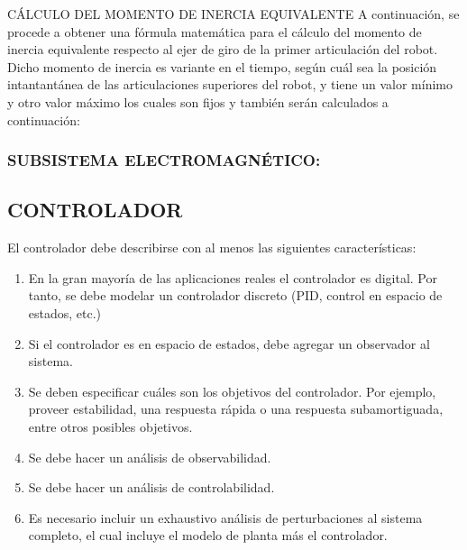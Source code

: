 \documentclass{article}
\begin{document}
CÁLCULO DEL MOMENTO DE INERCIA EQUIVALENTE
A continuación, se procede a obtener una fórmula matemática para el cálculo del momento de inercia equivalente respecto al ejer de giro de la primer articulación del robot. Dicho momento de inercia es variante en el tiempo, según cuál sea la posición intantantánea de las articulaciones superiores del robot, y tiene un valor mínimo y otro valor máximo los cuales son fijos y también serán calculados a continuación:


\subsubsection*{SUBSISTEMA ELECTROMAGNÉTICO:}
\label{sec:SUBSISTEMA ELECTROMAGNÉTICO:}




















\subsection{CONTROLADOR}
\label{sec:CONTROLADOR}

El controlador debe describirse con al menos las siguientes características:
\begin{enumerate}
    \item En la gran mayoría de las aplicaciones reales el controlador es digital. Por tanto, se debe modelar un controlador discreto (PID, control en espacio de estados, etc.)

    \item Si el controlador es en espacio de estados, debe agregar un observador al sistema.

    \item Se deben especificar cuáles son los objetivos del controlador. Por ejemplo, proveer estabilidad, una respuesta rápida o una respuesta subamortiguada, entre otros posibles objetivos.

    \item Se debe hacer un análisis de observabilidad.

    \item Se debe hacer un análisis de controlabilidad.

    \item Es necesario incluir un exhaustivo análisis de perturbaciones al sistema completo, el cual incluye el modelo de planta más el controlador.
\end{enumerate}
\end{document}
